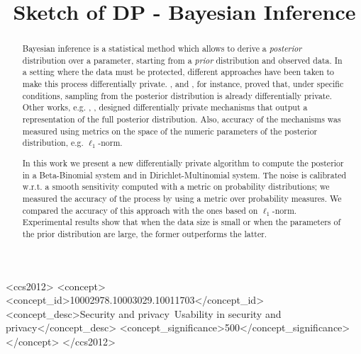 \documentclass[sigconf, anonymous]{acmart}
\begin{document}
\title{Sketch of DP - Bayesian Inference} %

\begin{abstract}
Bayesian inference is a statistical method which allows to derive a
\emph{posterior} distribution over a parameter, starting from a
\emph{prior} distribution and observed data.  In a setting where the
data must be protected, different approaches have been taken to make
this process differentially private. \citet{dimitrakakis2014robust},
and \citet{wang2015privacy}, for instance, proved that, under specific
conditions, sampling from the posterior distribution is already
differentially private. Other works,
e.g. \cite{zhang2016differential}, \cite{foulds2016theory}, designed
differentially private mechanisms that output a representation of the
full posterior distribution. Also, accuracy of the mechanisms was
measured using metrics on the space of the numeric parameters of the
posterior distribution, e.g. $\ell_1$-norm.

In this work we present a new differentially private algorithm to
compute the posterior in a Beta-Binomial system and in Dirichlet-Multinomial system.
The noise is calibrated w.r.t. a smooth
sensitivity computed with a metric on probability distributions; we
measured the accuracy of the process by using a metric over
probability measures. We compared the accuracy of this approach with
the ones based on $\ell_1$-norm. Experimental results show that when
the data size is small or when the parameters of the prior
distribution are large, the former outperforms the latter.

\end{abstract}


\begin{CCSXML}
<ccs2012>
<concept>
<concept_id>10002978.10003029.10011703</concept_id>
<concept_desc>Security and privacy~Usability in security and privacy</concept_desc>
<concept_significance>500</concept_significance>
</concept>
</ccs2012>
\end{CCSXML}



\maketitle
\end{document}

